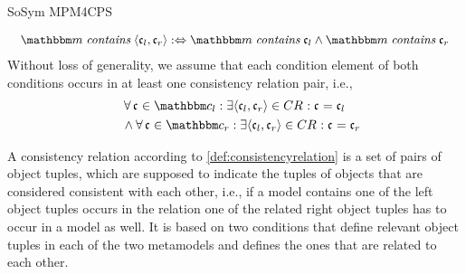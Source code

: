 \begin{copiedFrom}{SoSym MPM4CPS}
\begin{definition}
    \begin{align*}
        \formulaskip & 
        \modelset{m} \mathtext{contains} \tupled{\conditionelement{c}{l}, \conditionelement{c}{r}} \equivalentperdefinition \modelset{m} \mathtext{contains} \conditionelement{c}{l} \land \modelset{m} \mathtext{contains} \conditionelement{c}{r}
    \end{align*}
    Without loss of generality, we assume that each condition element of both conditions occurs in at least one consistency relation pair, i.e.,
    \begin{align*}
        \formulaskip & 
        \forall \conditionelement{c}{} \in \condition{c}{l} : \exists \tupled{\conditionelement{c}{l}, \conditionelement{c}{r}} \in \consistencyrelation{CR}{} : \conditionelement{c}{} = \conditionelement{c}{l}\\
        &  
        \land \forall \conditionelement{c}{} \in \condition{c}{r} : \exists \tupled{\conditionelement{c}{l}, \conditionelement{c}{r}} \in \consistencyrelation{CR}{} : \conditionelement{c}{} = \conditionelement{c}{r}
    \end{align*}
\end{definition}

A consistency relation according to \autoref{def:consistencyrelation} is a set of pairs of object tuples, which are supposed to indicate the tuples of objects that are considered consistent with each other, i.e., if a model contains one of the left object tuples occurs in the relation one of the related right object tuples has to occur in a model as well.
It is based on two conditions that define relevant object tuples in each of the two metamodels and defines the ones that are related to each other.


\end{copiedFrom}

